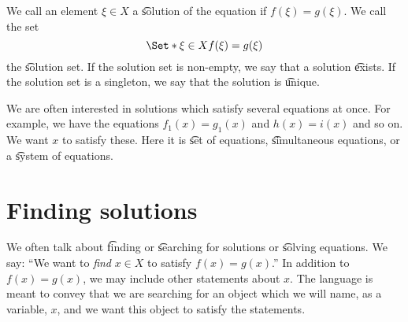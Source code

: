 We call an element $\xi  \in X$ a \t{solution} of the equation if $f(\xi ) = g(\xi )$.
We call the set
\[
\Set*{\xi  \in X}{f(\xi ) = g(\xi )}
\]
the \t{solution set}.
If the solution set is non-empty, we say that a solution \t{exists}.
If the solution set is a singleton, we say that the solution is \t{unique}.

We are often interested in solutions which satisfy several equations at once.
For example, we have the equations $f_1(x) = g_1(x)$ and $h(x) = i(x)$ and so on.
We want $x$ to satisfy these.
Here it is \t{set of equations}, \t{simultaneous equations}, or a \t{system of equations}.

\section*{Finding solutions}

We often talk about \t{finding} or \t{searching} for solutions or \t{solving equations}.
We say: ``We want to \textit{find} $x \in X$ to satisfy $f(x) = g(x)$.''
In addition to $f(x) = g(x)$, we may include other statements about $x$.
The language is meant to convey that we are searching for an object which we will name, as a variable, $x$, and we want this object to satisfy the statements.
